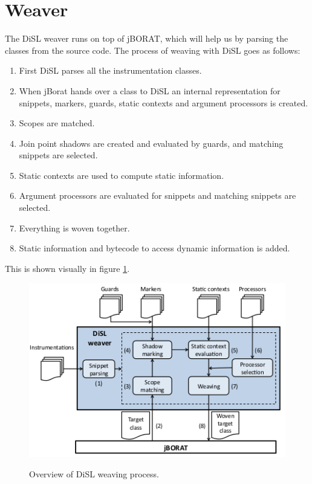 \documentclass[a4paper]{report}
\begin{document}
\section{Weaver}
The DiSL weaver runs on top of jBORAT, which will help us by parsing the classes from the source code. The process of weaving with DiSL goes as follows:
\begin{enumerate}
\item First DiSL parses all the instrumentation classes.
\item When jBorat hands over a class to DiSL an internal representation for snippets, markers, guards, static contexts and argument processors is created.
\item Scopes are matched.
\item Join point shadows are created and evaluated by guards, and matching snippets are selected.
\item Static contexts are used to compute static information.
\item Argument processors are evaluated for snippets and matching snippets are selected.
\item Everything is woven together.
\item Static information and bytecode to access dynamic information is added.
\end{enumerate}
This is shown visually in figure \ref{fig:DiSL_Weaver}.\\
\begin{figure}[h!]
\centering
\includegraphics[scale=0.5]{images/Languages/DiSL_Weaver.png}\\
\caption{Overview of DiSL weaving process.\citep{marek_disl:_2012}}
\label{fig:DiSL_Weaver}
\end{figure}
\end{document}
